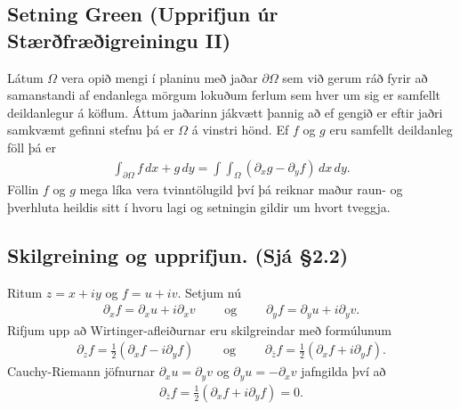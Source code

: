 \documentclass[a4paper,10pt,icelandic]{sphinxmanual}
\begin{document}
\subsection{Setning Green (Upprifjun úr Stærðfræðigreiningu II)}
\label{\detokenize{Kafli03:setning-green-upprifjun-ur-staerfraeigreiningu-ii}}
Látum \(\Omega\) vera opið mengi í planinu með jaðar \(\partial \Omega\) sem við gerum ráð fyrir að samanstandi af endanlega mörgum lokuðum ferlum sem hver um sig er samfellt deildanlegur á köflum. Áttum jaðarinn jákvætt þannig að ef gengið er eftir jaðri samkvæmt gefinni stefnu þá er \(\Omega\) á vinstri hönd. Ef \(f\) og \(g\) eru samfellt deildanleg föll þá er
\begin{equation*}
\begin{split}\int_{\partial \Omega} f\,dx+g\,dy=\int\!\!\int_\Omega \left(\partial_x g-\partial_y f\right)\,dx\,dy.\end{split}
\end{equation*}
Föllin \(f\) og \(g\) mega líka vera tvinntölugild því þá reiknar maður raun- og þverhluta heildis sitt í hvoru lagi og setningin gildir um hvort tveggja.


\subsection{Skilgreining og upprifjun. (Sjá \S{}2.2)}
\label{\detokenize{Kafli03:skilgreining-og-upprifjun-sja-2-2}}
Ritum \(z=x+iy\) og \(f=u+iv\). Setjum nú
\begin{equation*}
\begin{split}\partial_x f=\partial_x u+i\partial_xv\qquad\mbox{ og }\qquad
\partial_y f=\partial_y u+i\partial_yv.\end{split}
\end{equation*}
Rifjum upp að Wirtinger-afleiðurnar eru skilgreindar með formúlunum
\begin{equation*}
\begin{split}\partial_z f=\tfrac{1}{2}(\partial_xf-i\partial_yf)\qquad\mbox{ og }\qquad
\partial_{\overline{z}} f=\tfrac{1}{2}(\partial_xf+i\partial_yf).\end{split}
\end{equation*}
Cauchy-Riemann jöfnurnar \(\partial_xu=\partial_yv\) og \(\partial_yu=-\partial_xv\) jafngilda því að
\begin{equation*}
\begin{split}\partial_{\overline{z}} f=\tfrac{1}{2}(\partial_xf+i\partial_yf)=0.\end{split}
\end{equation*}
\end{document}
